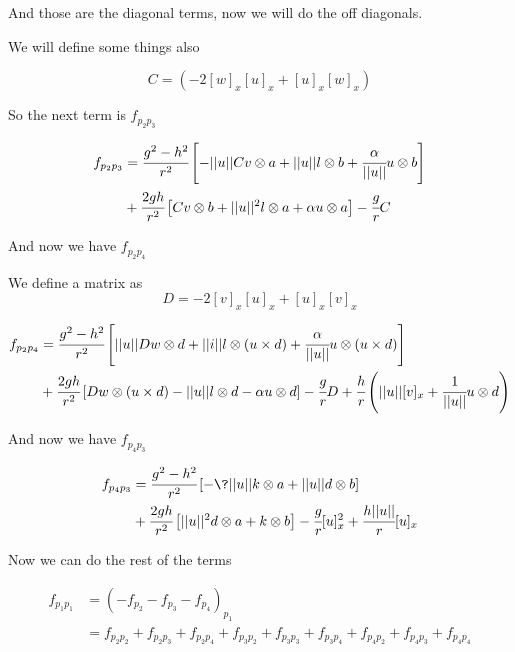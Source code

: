 \documentclass[11pt]{article}
\theoremstyle{plain}
\theoremstyle{definition}
\begin{document}
And those are the diagonal terms, now we will do the off diagonals.

We will define some things also 

\begin{equation}
    C = (-2[w]_x[u]_x + [u]_x[w]_x)
\end{equation}

So the next term is $f_{p_2p_3}$

\begin{align}
    f_{p_2 p_3}&= \cfrac{g^2-h^2}{r^2}\left[  -||u||Cv \otimes a + ||u|| l \otimes b  + \cfrac{\alpha }{||u||} u \otimes b  \right]\\
    & +\cfrac{2gh }{r^2}\left[Cv \otimes b + ||u||^2 l\otimes a + \alpha u \otimes a \right] - \cfrac{g}{r}C
\end{align}


And now we have $f_{p_2p_4}$

We define a matrix as  
\begin{equation}
    D = -2[v]_x[u]_x + [u]_x[v]_x
\end{equation}

\begin{align}
    f_{p_2 p_4} &= \cfrac{g^2-h^2}{r^2}\left[||u|| Dw \otimes d + ||i|| l \otimes (u\times d) + \cfrac{\alpha}{||u||}u \otimes (u\times d ) \right]\\
    & +\cfrac{2gh}{r^2}\left[ D w \otimes (u\times d) - ||u||l \otimes d  - \alpha u \otimes d \right] - \cfrac{g}{r}D + \cfrac{h}{r}\left( ||u||[v]_x + \cfrac{1}{||u||} u \otimes d \right)
\end{align}


And now we have $f_{p_4p_3}$

\begin{align}
    f_{p_4p_3}&= \cfrac{g^2-h^2}{r^2}\left[ -\? ||u|| k \otimes a + ||u||d \otimes b   \right]\\
    &+ \cfrac{2gh}{r^2}\left[  ||u||^2 d\otimes a + k \otimes b  \right] - \cfrac{g}{r}[u]_x^2 +\cfrac{h||u||}{r} [u]_x
\end{align}


Now we can do the rest of the terms 

\begin{align}
    f_{p_1p_1 } &= (-f_{p_2} -f_{p_3} -f_{p_4})_p_1\\
                &= f_{p_2p_2} + f_{p_2p_3} + f_{p_2p_4} + f_{p_3p_2} +f_{p_3p_3} + f_{p_3p_4} + f_{p_4p_2} + f_{p_4p_3} + f_{p_4p_4}
\end{align}
\end{document}
